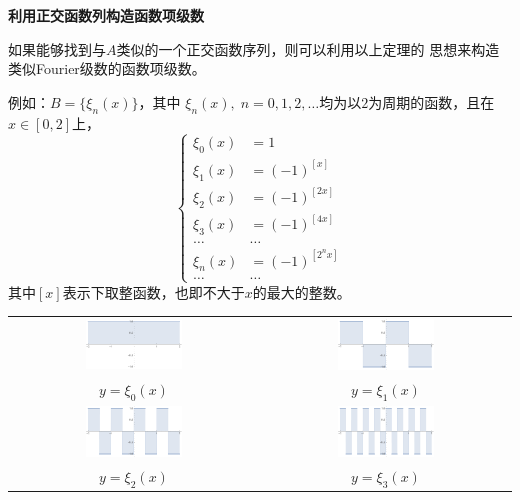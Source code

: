 \begin{shaded}
	{\bf 利用正交函数列构造函数项级数}
	
	如果能够找到与$A$类似的一个正交函数序列，则可以利用以上定理的
	思想来构造类似Fourier级数的函数项级数。
	
	例如：$B=\{\xi_n(x)\}$，其中
	$\xi_n(x),\;n=0,1,2,\ldots$均为以$2$为周期的函数，且在$x\in[0,2]$上，
	$$
		\left\{\begin{array}{rl}
			\xi_0(x)&=1\\
			\xi_1(x)&=(-1)^{[x]}\\
			\xi_2(x)&=(-1)^{[2x]}\\
			\xi_3(x)&=(-1)^{[4x]}\\
			\ldots&\ldots\\
			\xi_n(x)&=(-1)^{[2^nx]}\\
			\ldots&\ldots
		\end{array}\right.
	$$
	其中$[x]$表示下取整函数，也即不大于$x$的最大的整数。
	
	\begin{center}
		\begin{tabular}{cc}
			\includegraphics[width=0.4\textwidth]{./images/ch12/xi0.pdf}
			& \includegraphics[width=0.4\textwidth]{./images/ch12/xi1.pdf}\\
			$y=\xi_0(x)$ & $y=\xi_1(x)$\\[1em] 
			\includegraphics[width=0.4\textwidth]{./images/ch12/xi2.pdf}
			& \includegraphics[width=0.4\textwidth]{./images/ch12/xi3.pdf}\\
			$y=\xi_2(x)$ & $y=\xi_3(x)$ 
		\end{tabular}
	\end{center}
	

\end{shaded}
